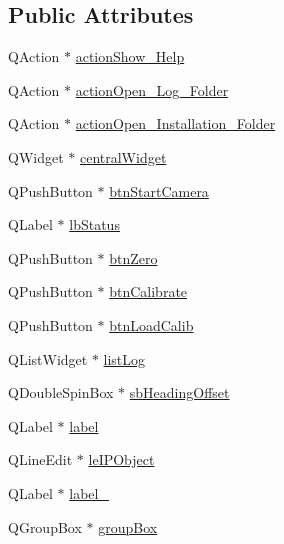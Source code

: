 \subsection*{Public Attributes}
\begin{DoxyCompactItemize}
\item 
Q\+Action $\ast$ \hyperlink{class_ui___rigid_track_class_aeb9fefc5e71112c520ae22f6e818d01f}{action\+Show\+\_\+\+Help}
\item 
Q\+Action $\ast$ \hyperlink{class_ui___rigid_track_class_a3fb674ec6f96c57d3eef03900b7162ba}{action\+Open\+\_\+\+Log\+\_\+\+Folder}
\item 
Q\+Action $\ast$ \hyperlink{class_ui___rigid_track_class_adbf50ad17608dbfe8a688dc8f18d1ec3}{action\+Open\+\_\+\+Installation\+\_\+\+Folder}
\item 
Q\+Widget $\ast$ \hyperlink{class_ui___rigid_track_class_ad0855ddf1efd8f0c8821dd2142f6221d}{central\+Widget}
\item 
Q\+Push\+Button $\ast$ \hyperlink{class_ui___rigid_track_class_a72fc55bdb6021b52b9ec0e97e112d57d}{btn\+Start\+Camera}
\item 
Q\+Label $\ast$ \hyperlink{class_ui___rigid_track_class_abeac37c5be33dbe8f2805a9e688b8329}{lb\+Status}
\item 
Q\+Push\+Button $\ast$ \hyperlink{class_ui___rigid_track_class_acc37707b26574be199e2f33d2f2c31fe}{btn\+Zero}
\item 
Q\+Push\+Button $\ast$ \hyperlink{class_ui___rigid_track_class_aac22c36a194fd08f919a8e00a78cb1b0}{btn\+Calibrate}
\item 
Q\+Push\+Button $\ast$ \hyperlink{class_ui___rigid_track_class_aafe138bcd4b21e4608ab39f76ca6e042}{btn\+Load\+Calib}
\item 
Q\+List\+Widget $\ast$ \hyperlink{class_ui___rigid_track_class_a8573490fa3f39f7c45af77f33c9b9297}{list\+Log}
\item 
Q\+Double\+Spin\+Box $\ast$ \hyperlink{class_ui___rigid_track_class_a7a9db994f872078ce46a81b435f70cf9}{sb\+Heading\+Offset}
\item 
Q\+Label $\ast$ \hyperlink{class_ui___rigid_track_class_a2de57788f55b334c451dc9d0449b104c}{label}
\item 
Q\+Line\+Edit $\ast$ \hyperlink{class_ui___rigid_track_class_a8372ffd3f54aa2672228e28e48fe18f3}{le\+I\+P\+Object}
\item 
Q\+Label $\ast$ \hyperlink{class_ui___rigid_track_class_adad99dbe226b6a900918729abb37a6b8}{label\+\_}
\item 
Q\+Group\+Box $\ast$ \hyperlink{class_ui___rigid_track_class_a895128ce9cc7dda6c57b654512e12e7d}{group\+Box}

\end{DoxyCompactItemize}
